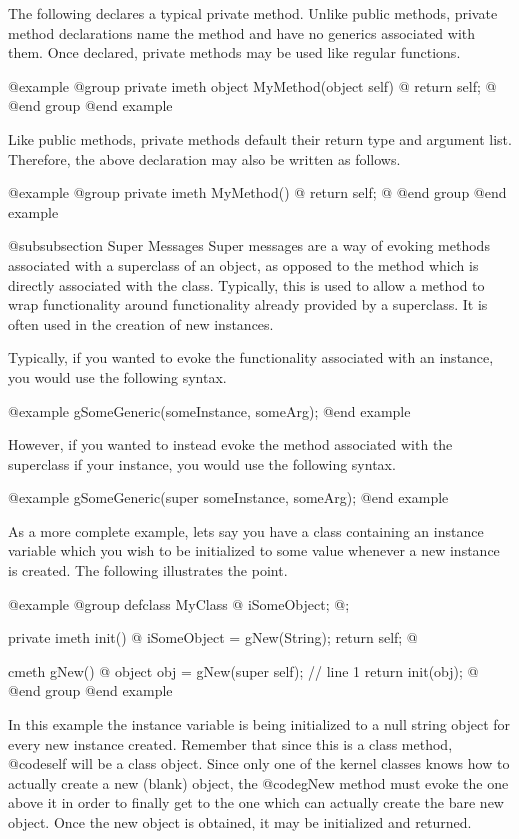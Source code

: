 The following declares a typical private method.  Unlike public
methods, private method declarations name the method and have
no generics associated with them.  Once declared, private methods may
be used like regular functions.


@example
@group
private imeth   object  MyMethod(object self)
@{
        return self;
@}
@end group
@end example


Like public methods, private methods default their return type and
argument list.  Therefore, the above declaration may also be written as
follows.

@example
@group
private imeth   MyMethod()
@{
        return self;
@}
@end group
@end example


@subsubsection Super Messages
Super messages are a way of evoking methods associated with a superclass
of an object, as opposed to the method which is directly associated
with the class.  Typically, this is used to allow a method to wrap
functionality around functionality already provided by a superclass.
It is often used in the creation of new instances.

Typically, if you wanted to evoke the functionality associated with an
instance, you would use the following syntax.

@example
        gSomeGeneric(someInstance, someArg);
@end example

However, if you wanted to instead evoke the method associated with the
superclass if your instance, you would use the following syntax.

@example
        gSomeGeneric(super  someInstance, someArg);
@end example

As a more complete example, lets say you have a class containing an
instance variable which you wish to be initialized to some value
whenever a new instance is created.  The following illustrates the
point.

@example
@group
defclass  MyClass  @{
        iSomeObject;
@};

private imeth init()
@{
        iSomeObject = gNew(String);
        return self;
@}

cmeth  gNew()
@{
        object  obj = gNew(super self);  // line 1
        return init(obj);
@}
@end group
@end example

In this example the instance variable is being initialized to a null
string object for every new instance created.  Remember that since
this is a class method, @code{self} will be a class object.  Since
only one of the kernel classes knows how to actually create a new
(blank) object, the @code{gNew} method must evoke the one above it
in order to finally get to the one which can actually create the
bare new object.  Once the new object is obtained, it may be initialized
and returned.

